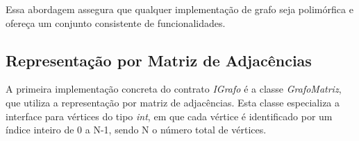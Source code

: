 \documentclass{sbc2023}%
\begin{document}









    
    Essa abordagem assegura que qualquer implementação de grafo seja polimórfica e ofereça um conjunto consistente de funcionalidades.
    
    \subsection{Representação por Matriz de Adjacências}
    
    A primeira implementação concreta do contrato \textit{IGrafo} é a classe \textit{GrafoMatriz}, que utiliza a representação por matriz de adjacências. Esta classe especializa a interface para vértices do tipo \textit{int}, em que cada vértice é identificado por um índice inteiro de 0 a N-1, sendo N o número total de vértices. 
\end{document}
